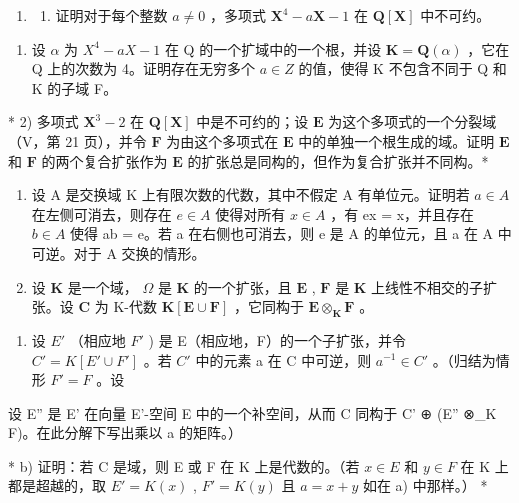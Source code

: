 \BourbakiExerciseGroup

\begin{enumerate}
\def\labelenumi{\arabic{enumi})}
\tightlist
\item
  \begin{enumerate}
  \def\labelenumii{\alph{enumii})}
  \tightlist
  \item
    证明对于每个整数 \(a \neq 0\) ，多项式 \(\mathbf{X}^4 - a\mathbf{X} - 1\) 在 \(\mathbf{Q}[\mathbf{X}]\) 中不可约。
  \end{enumerate}
\end{enumerate}

\begin{enumerate}
\def\labelenumi{\alph{enumi})}
\setcounter{enumi}{1}
\tightlist
\item
  设 \(\alpha\) 为 \(X^{4}-aX-1\) 在 Q 的一个扩域中的一个根，并设 \(\mathbf{K}=\mathbf{Q}(\alpha)\) ，它在 Q 上的次数为 4。证明存在无穷多个 \(a\in Z\) 的值，使得 K 不包含不同于 Q 和 K 的子域 F。
\end{enumerate}

* 2) 多项式 \(\mathbf{X}^3 - 2\) 在 \(\mathbf{Q}[\mathbf{X}]\) 中是不可约的；设 \(\mathbf{E}\) 为这个多项式的一个分裂域（V，第 21 页），并令 \(\mathbf{F}\) 为由这个多项式在 \(\mathbf{E}\) 中的单独一个根生成的域。证明 \(\mathbf{E}\) 和 \(\mathbf{F}\) 的两个复合扩张作为 \(\mathbf{E}\) 的扩张总是同构的，但作为复合扩张并不同构。*

\begin{enumerate}
\def\labelenumi{\arabic{enumi})}
\setcounter{enumi}{2}
\item
  设 A 是交换域 K 上有限次数的代数，其中不假定 A 有单位元。证明若 \(a \in A\) 在左侧可消去，则存在 \(e \in A\) 使得对所有 \(x \in A\) ，有 ex = x，并且存在 \(b \in A\) 使得 ab = e。若 a 在右侧也可消去，则 e 是 A 的单位元，且 a 在 A 中可逆。对于 A 交换的情形。
\item
  设 \(\mathbf{K}\) 是一个域， \(\Omega\) 是 \(\mathbf{K}\) 的一个扩张，且 \(\mathbf{E}\) , \(\mathbf{F}\) 是 \(\mathbf{K}\) 上线性不相交的子扩张。设 \(\mathbf{C}\) 为 K-代数 \(\mathbf{K}[\mathbf{E} \cup \mathbf{F}]\) ，它同构于 \(\mathbf{E} \otimes_{\mathbf{K}} \mathbf{F}\) 。
\end{enumerate}

\begin{enumerate}
\def\labelenumi{\alph{enumi})}
\tightlist
\item
  设 \(E'\) （相应地 \(F'\) ) 是 E（相应地，F）的一个子扩张，并令 \(C' = K[E' \cup F']\) 。若 \(C'\) 中的元素 a 在 C 中可逆，则 \(a^{-1} \in C'\) 。（归结为情形 \(F' = F\) 。设
\end{enumerate}

设 E'' 是 E' 在向量 E'-空间 E 中的一个补空间，从而 C 同构于 C' ⊕ (E'' ⊗\_K F)。在此分解下写出乘以 a 的矩阵。）

* b) 证明：若 C 是域，则 E 或 F 在 K 上是代数的。（若 \(x \in E\) 和 \(y \in F\) 在 K 上都是超越的，取 \(E' = K(x)\) , \(F' = K(y)\) 且 \(a = x + y\) 如在 a) 中那样。） *
\relax{}
